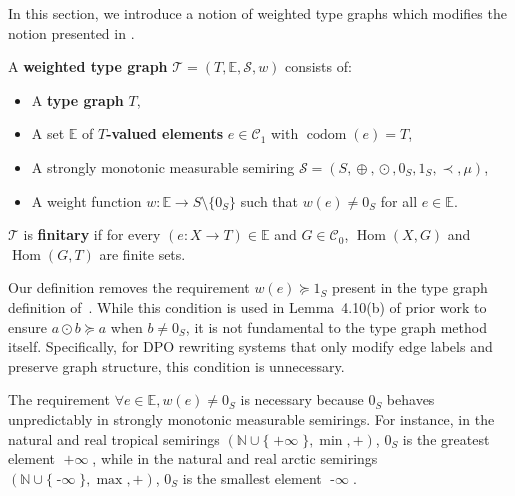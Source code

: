 In this section, we introduce a notion of weighted type graphs which modifies the notion presented in \cite{endrullis2024generalized}.

\begin{definition}
    \label{def:weighted_type_graph}
    A \textbf{weighted type graph} \(\mathcal{T} \mathop{=} (T, \mathbb{E}, \mathcal{S}, w)\) consists of:
    \begin{itemize}
        \item A \textbf{type graph} \(T\),
        \item A set \(\mathbb{E}\) of \textbf{\(T\)-valued elements} \(e \mathop{\in} \mathcal{C}_1\) with $\operatorname{codom}(e) \mathop{=} T$,
        \item A strongly monotonic measurable semiring \(\mathcal{S}=(S, \mathop{\oplus}, \mathop{\odot}, 0_S, 1_S, \prec, \mu)\),
        \item A weight function \(w : \mathbb{E} \mathop{\to} S \mathop{\setminus} \{0_S\}\) such that \(w(e) \mathop{\neq} 0_S\) for all \(e \mathop{\in} \mathbb{E}\).
    \end{itemize}
    \(\mathcal{T}\) is \textbf{finitary} if for every \((e:X \mathop{\to} T) \mathop{\in} \mathbb{E}\) and \(G \mathop{\in} \mathcal{C}_0\), \(\operatorname{Hom}(X, G)\) and \(\operatorname{Hom}(G, T)\) are finite sets.
\end{definition}

\begin{remark}
    \label{remark:greater_than_1}
    Our definition removes the requirement \(w(e) \mathop{\succeq} 1_S\) present in the type graph definition of~\cite{endrullis2024generalized}. While this condition is used in Lemma~4.10(b) of prior work to ensure \(a \mathop{\odot} b \mathop{\succeq} a\) when \(b \mathop{\neq} 0_S\), it is not fundamental to the type graph method itself. Specifically, for DPO rewriting systems that only modify edge labels and preserve graph structure, this condition is unnecessary.
\end{remark}

\begin{remark}
    \label{remark:semiring_0_unpredictable}
    The requirement \(\forall e \mathop{\in} \mathbb{E}, w(e) \mathop{\neq} 0_S\) is necessary because \(0_S\) behaves unpredictably in strongly monotonic measurable semirings. For instance, in the natural and real tropical semirings \((\mathbb{N} \mathop{\cup} \{\mathop{+\infty}\}, \mathop{\min}, +)\), \(0_S\) is the greatest element \(\mathop{+\infty}\), while in the natural and real arctic semirings \((\mathbb{N} \mathop{\cup} \{\mathop{-\infty}\}, \max, +)\), \(0_S\) is the smallest element \(\mathop{-\infty}\).
\end{remark}

